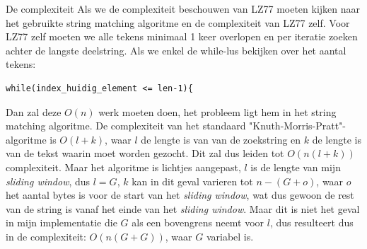 \documentclass[10pt,a4paper]{report}
\begin{document}
De complexiteit 
Als we de complexiteit beschouwen van LZ77 moeten kijken naar het gebruikte string matching algoritme en de complexiteit van LZ77 zelf.  Voor LZ77 zelf moeten we alle tekens minimaal 1 keer overlopen en per iteratie zoeken achter de langste deelstring. Als we enkel de while-lus bekijken over het aantal tekens:
\begin{lstlisting}
while(index_huidig_element <= len-1){
\end{lstlisting}
Dan zal deze $O(n)$ werk moeten doen, het probleem ligt hem in het string matching algoritme. De complexiteit van het standaard "Knuth-Morris-Pratt"-algoritme is $O(l+k)$, waar $l$ de lengte is van van de zoekstring en $k$ de lengte is van de tekst waarin moet worden gezocht. Dit zal dus leiden tot $O(n(l+k))$ complexiteit. Maar het algoritme is lichtjes aangepast, $l$ is de lengte van mijn \emph{sliding window}, dus $l=G$, $k$ kan in dit geval varieren tot $n-(G+o)$, waar $o$ het aantal bytes is voor de start van het \emph{sliding window}, wat dus gewoon de rest van de string is vanaf het einde van het \emph{sliding window}. Maar dit is niet het geval in mijn implementatie die $G$ als een bovengrens neemt voor $l$, dus resulteert dus in de complexiteit: $O(n(G+G))$, waar $G$ variabel is.
\end{document}
